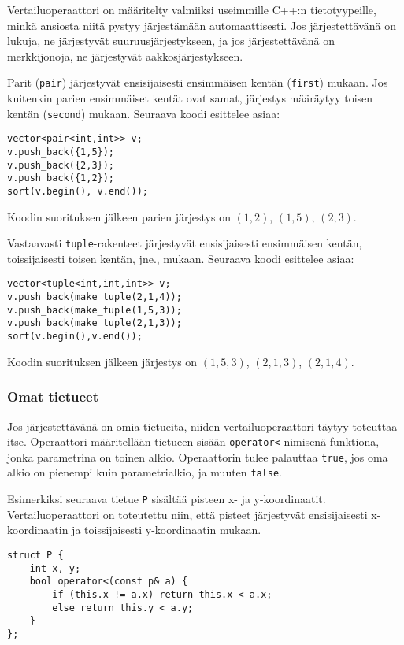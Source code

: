 Vertailuoperaattori on määritelty valmiiksi
useimmille C++:n tietotyypeille,
minkä ansiosta niitä pystyy järjestämään automaattisesti.
Jos järjestettävänä on lukuja, ne järjestyvät
suuruusjärjestykseen,
ja jos järjestettävänä on merkkijonoja,
ne järjestyvät aakkosjärjestykseen.


Parit (\texttt{pair}) järjestyvät ensisijaisesti
ensimmäisen kentän (\texttt{first}) mukaan.
Jos kuitenkin parien ensimmäiset kentät ovat samat,
järjestys määräytyy toisen kentän (\texttt{second}) mukaan.
Seuraava koodi esittelee asiaa:

\begin{lstlisting}
vector<pair<int,int>> v;
v.push_back({1,5});
v.push_back({2,3});
v.push_back({1,2});
sort(v.begin(), v.end());
\end{lstlisting}

Koodin suorituksen jälkeen parien järjestys on
$(1,2)$, $(1,5)$, $(2,3)$.

Vastaavasti \texttt{tuple}-rakenteet
järjestyvät ensisijaisesti ensimmäisen kentän,
toissijaisesti toisen kentän, jne., mukaan.
Seuraava koodi esittelee asiaa:
\begin{lstlisting}
vector<tuple<int,int,int>> v;
v.push_back(make_tuple(2,1,4));
v.push_back(make_tuple(1,5,3));
v.push_back(make_tuple(2,1,3));
sort(v.begin(),v.end());
\end{lstlisting}
Koodin suorituksen jälkeen järjestys on
$(1,5,3)$, $(2,1,3)$, $(2,1,4)$.

\subsubsection{Omat tietueet}

Jos järjestettävänä on omia tietueita,
niiden vertailuoperaattori täytyy toteuttaa itse.
Operaattori määritellään tietueen sisään
\texttt{operator<}-nimisenä funktiona,
jonka parametrina on toinen alkio.
Operaattorin tulee palauttaa \texttt{true},
jos oma alkio on pienempi kuin parametrialkio,
ja muuten \texttt{false}.

Esimerkiksi seuraava tietue \texttt{P}
sisältää pisteen x- ja y-koordinaatit.
Vertailuoperaattori on toteutettu niin,
että pisteet järjestyvät ensisijaisesti x-koor\-di\-naa\-tin
ja toissijaisesti y-koordinaatin mukaan.

\begin{lstlisting}
struct P {
    int x, y;
    bool operator<(const p& a) {
        if (this.x != a.x) return this.x < a.x;
        else return this.y < a.y;
    }
};
\end{lstlisting}

